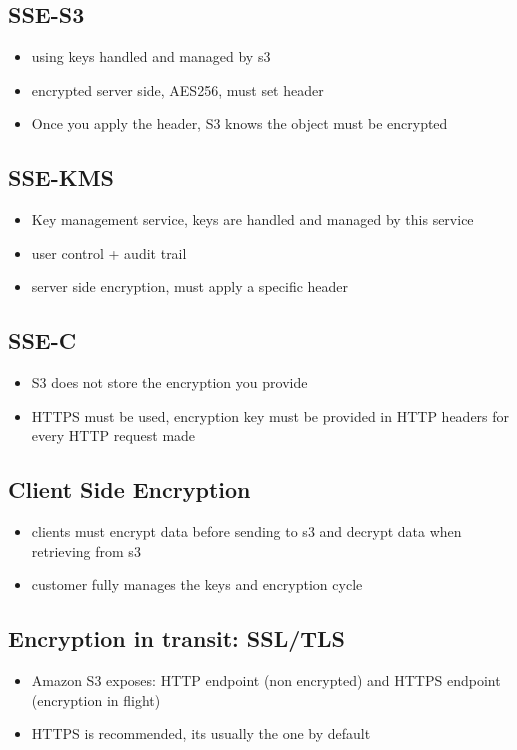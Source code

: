 \documentclass[]{scrartcl}
\begin{document}
\subsection{SSE-S3}
\begin{itemize}
	\item using keys handled and managed by s3
	\item encrypted server side, AES256, must set header
	\item Once you apply the header, S3 knows the object must be encrypted
\end{itemize}

\subsection{SSE-KMS}
\begin{itemize}
	\item Key management service, keys are handled and managed by this service
	\item user control + audit trail
	\item server side encryption, must apply a specific header
\end{itemize}

\subsection{SSE-C}
\begin{itemize}
	\item S3 does not store the encryption you provide
	\item HTTPS must be used, encryption key must be provided in HTTP headers for every HTTP request made
\end{itemize}

\subsection{Client Side Encryption}
\begin{itemize}
	\item clients must encrypt data before sending to s3 and decrypt data when retrieving from s3
	\item customer fully manages the keys and encryption cycle
\end{itemize}

\subsection{Encryption in transit: SSL/TLS}
\begin{itemize}
	\item Amazon S3 exposes: HTTP endpoint (non encrypted) and HTTPS endpoint (encryption in flight)
	\item HTTPS is recommended, its usually the one by default
\end{itemize}
\end{document}
